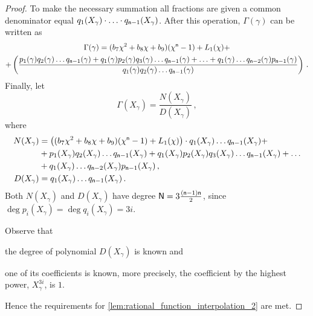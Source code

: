 \documentclass[runningheads,11pt]{llncs}
\theoremstyle{definition}
\begin{document}
\begin{proof}
To make the necessary summation all fractions are given a common denominator equal $q_1 (X_\gamma) \cdot \ldots \cdot q_{\mathsf{n} - 1} (X_\gamma)$. After this operation, $\Gamma(\gamma)$ can be written as
\begin{multline*}
  \Gamma(\gamma) = (b_7 \chi^2 + b_8 \chi + b_9) (\chi^{\mathsf{n}} - 1) + L_1 (\chi) + \\
   + \left(\frac{
   p_1(\gamma) q_2(\gamma) \ldots q_{\mathsf{n} - 1}(\gamma) + q_1(\gamma) p_2(\gamma) q_3(\gamma) \ldots q_{\mathsf{n} - 1}(\gamma) + \ldots + q_1(\gamma) \ldots q_{\mathsf{n} - 2}(\gamma) p_{\mathsf{n} - 1}(\gamma)
   }{
   q_1(\gamma) q_2(\gamma) \ldots q_{\mathsf{n} - 1}(\gamma)
   }
  \right)\,.
\end{multline*}
Finally, let
\[
  \Gamma (X_\gamma) = \frac{N(X_\gamma)}{D(X_\gamma)}\,,
\]
where
\begin{align*}
  N(X_\gamma) & = \left((b_7 \chi^2 + b_8 \chi + b_9) (\chi^{\mathsf{n}} - 1) + L_1 (\chi)\right) \cdot q_1(X_\gamma) \ldots q_{\mathsf{n} - 1}(X_\gamma) + \\
   & + p_1(X_\gamma) q_2(X_\gamma) \ldots q_{\mathsf{n} - 1}(X_\gamma) + q_1(X_\gamma) p_2(X_\gamma) q_3(X_\gamma) \ldots q_{\mathsf{n} - 1}(X_\gamma) + \ldots \\
   & + q_1(X_\gamma) \ldots q_{\mathsf{n} - 2}(X_\gamma) p_{\mathsf{n} - 1}(X_\gamma)\,,\\
  D(X_\gamma) & = q_1(X_\gamma)  \ldots q_{\mathsf{n} - 1}(X_\gamma)\,.
\end{align*}
Both $N(X_\gamma)$ and $D(X_\gamma)$ have degree $\mathsf{N} = 3 \frac{(\mathsf{n} - 1) \mathsf{n}}{2}$, since $\deg p_i (X_\gamma) \allowbreak = \deg q_i (X_\gamma) = 3 i$.

Observe that
\begin{inparaenum}[(i)]
	\item the degree of polynomial $D(X_\gamma)$ is known and
	\item one of its coefficients is known, more precisely, the coefficient by the highest power, $X_\gamma^{3i}$, is $1$.
\end{inparaenum}
Hence the requirements for \cref{lem:rational_function_interpolation_2} are met.


\end{proof}
\end{document}
